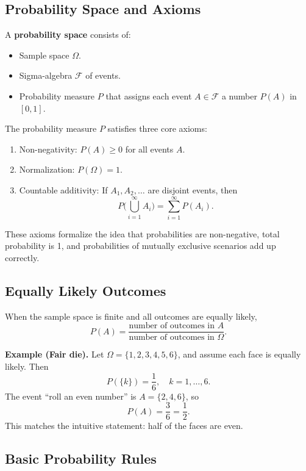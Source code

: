 \documentclass[11pt,a4paper]{article}
\begin{document}
\subsection{Probability Space and Axioms}

A \textbf{probability space} consists of:
\begin{itemize}
    \item Sample space \(\Omega\).
    \item Sigma-algebra \(\mathcal{F}\) of events.
    \item Probability measure \(P\) that assigns each event \(A \in \mathcal{F}\) a number \(P(A)\) in \([0,1]\).
\end{itemize}

The probability measure \(P\) satisfies three core axioms:
\begin{enumerate}
    \item Non-negativity: \(P(A) \ge 0\) for all events \(A\).
    \item Normalization: \(P(\Omega) = 1\).
    \item Countable additivity: If \(A_1, A_2, \dots\) are disjoint events, then
    \[
    P\Big(\bigcup_{i=1}^{\infty} A_i\Big) = \sum_{i=1}^{\infty} P(A_i).
    \]
\end{enumerate}

These axioms formalize the idea that probabilities are non-negative, total probability is 1, and probabilities of mutually exclusive scenarios add up correctly.

\subsection{Equally Likely Outcomes}

When the sample space is finite and all outcomes are equally likely,
\[
P(A) = \frac{\text{number of outcomes in } A}{\text{number of outcomes in } \Omega}.
\]

\textbf{Example (Fair die).}  
Let \(\Omega = \{1,2,3,4,5,6\}\), and assume each face is equally likely.  
Then
\[
P(\{k\}) = \frac{1}{6},\quad k=1,\dots,6.
\]
The event ``roll an even number'' is \(A=\{2,4,6\}\), so
\[
P(A) = \frac{3}{6} = \frac{1}{2}.
\]
This matches the intuitive statement: half of the faces are even.

\subsection{Basic Probability Rules}
\end{document}
